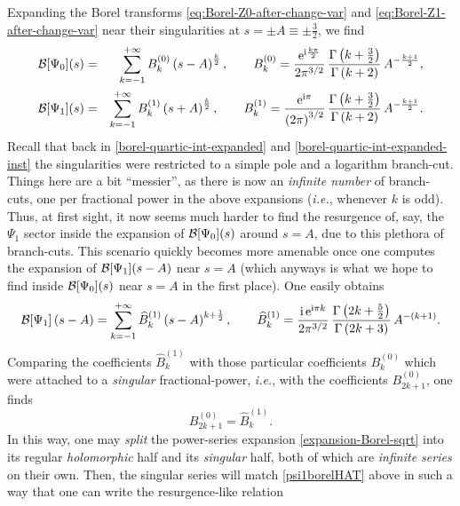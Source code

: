 \documentclass[11pt,a4paper]{article}
\newcommand{\CB}{{\cal B}}
\newcommand{\be}{\begin{equation}}
\newcommand{\ee}{\end{equation}}
\newcommand{\rme}{{\mathrm{e}}}
\newcommand{\rmi}{{\mathrm{i}}}
\begin{document}
Expanding the Borel transforms \eqref{eq:Borel-Z0-after-change-var} and \eqref{eq:Borel-Z1-after-change-var} near their singularities at $s = \pm A \equiv \pm \frac{3}{2}$, we find
%
\begin{eqnarray}
\label{expansion-Borel-sqrt}
\CB[\Psi_0](s) &=& \sum_{k=-1}^{+\infty} B_k^{(0)} \left( s - A \right)^{\frac{k}{2}}, \qquad B_k^{(0)} = \frac{\rme^{\rmi \frac{k\pi}{2}}}{2\pi^{3/2}}\, \frac{\Gamma \left( k+\frac{3}{2} \right)}{\Gamma \left( k+2 \right)}\, A^{-\frac{k+1}{2}}, \\
\CB[\Psi_1](s) &=& \sum_{k=-1}^{+\infty} B_k^{(1)} \left( s + A \right)^{\frac{k}{2}}, \qquad B_k^{(1)} = \frac{\rme^{\rmi\pi}}{\left(2\pi\right)^{3/2}}\, \frac{\Gamma \left( k+\frac{3}{2} \right)}{\Gamma \left( k+2 \right)}\, A^{-\frac{k+1}{2}}.
\end{eqnarray}
%
\noindent
Recall that back in \eqref{borel-quartic-int-expanded} and \eqref{borel-quartic-int-expanded-inst} the singularities were restricted to a simple pole and a logarithm branch-cut. Things here are a bit ``messier'', as there is now an \textit{infinite number} of branch-cuts, one per fractional power in the above expansions (\textit{i.e.}, whenever $k$ is odd). Thus, at first sight, it now seems much harder to find the resurgence of, say, the $\Psi_1$ sector inside the expansion of $\CB[\Psi_0](s)$ around $s=A$, due to this plethora of branch-cuts. This scenario quickly becomes more amenable once one computes the expansion of $\CB[\Psi_1](s-A)$ near $s=A$ (which anyways is what we hope to find inside $\CB[\Psi_0](s)$ near $s=A$ in the first place). One easily obtains
%
\begin{equation}
\label{psi1borelHAT}
\CB[\Psi_1] \left(s-A\right) = \sum_{k=-1}^{+\infty} \widehat{B}_k^{(1)} \left( s - A \right)^{k+\frac{1}{2}}, \qquad \widehat{B}_k^{(1)} = \frac{\rmi\, \rme^{\rmi\pi k}}{2\pi^{3/2}}\, \frac{\Gamma \left( 2k+\frac{5}{2} \right)}{\Gamma \left( 2k+3 \right)}\, A^{- \left( k+1 \right)}.
\end{equation}
%
\noindent
Comparing the coefficients $\widehat{B}_k^{(1)}$ with those particular coefficients $B_k^{(0)}$ which were attached to a \textit{singular} fractional-power, \textit{i.e.}, with the coefficients $B_{2k+1}^{(0)}$, one finds
%
\be
B_{2k+1}^{(0)} = \widehat{B}_k^{(1)}.
\ee
%
\noindent
In this way, one may \textit{split} the power-series expansion \eqref{expansion-Borel-sqrt} into its regular \textit{holomorphic} half and its \textit{singular} half, both of which are \textit{infinite series} on their own. Then, the singular series will match \eqref{psi1borelHAT} above in such a way that one can write the resurgence-like relation
\end{document}
